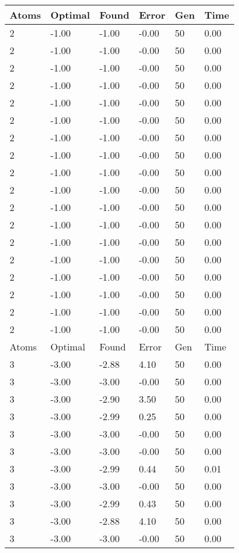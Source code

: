 \documentclass{report}
\begin{document}
\begin{appendix}
\begin{longtable}{llllll}
Atoms & Optimal & Found & Error & Gen & Time \\
\endfirsthead
%
\endhead
%
2 & -1.00 & -1.00 & -0.00 & 50 & 0.00 \\
2 & -1.00 & -1.00 & -0.00 & 50 & 0.00 \\
2 & -1.00 & -1.00 & -0.00 & 50 & 0.00 \\
2 & -1.00 & -1.00 & -0.00 & 50 & 0.00 \\
2 & -1.00 & -1.00 & -0.00 & 50 & 0.00 \\
2 & -1.00 & -1.00 & -0.00 & 50 & 0.00 \\
2 & -1.00 & -1.00 & -0.00 & 50 & 0.00 \\
2 & -1.00 & -1.00 & -0.00 & 50 & 0.00 \\
2 & -1.00 & -1.00 & -0.00 & 50 & 0.00 \\
2 & -1.00 & -1.00 & -0.00 & 50 & 0.00 \\
2 & -1.00 & -1.00 & -0.00 & 50 & 0.00 \\
2 & -1.00 & -1.00 & -0.00 & 50 & 0.00 \\
2 & -1.00 & -1.00 & -0.00 & 50 & 0.00 \\
2 & -1.00 & -1.00 & -0.00 & 50 & 0.00 \\
2 & -1.00 & -1.00 & -0.00 & 50 & 0.00 \\
2 & -1.00 & -1.00 & -0.00 & 50 & 0.00 \\
2 & -1.00 & -1.00 & -0.00 & 50 & 0.00 \\
2 & -1.00 & -1.00 & -0.00 & 50 & 0.00 \\
Atoms & Optimal & Found & Error & Gen & Time \\
3 & -3.00 & -2.88 & 4.10 & 50 & 0.00 \\
3 & -3.00 & -3.00 & -0.00 & 50 & 0.00 \\
3 & -3.00 & -2.90 & 3.50 & 50 & 0.00 \\
3 & -3.00 & -2.99 & 0.25 & 50 & 0.00 \\
3 & -3.00 & -3.00 & -0.00 & 50 & 0.00 \\
3 & -3.00 & -3.00 & -0.00 & 50 & 0.00 \\
3 & -3.00 & -2.99 & 0.44 & 50 & 0.01 \\
3 & -3.00 & -3.00 & -0.00 & 50 & 0.00 \\
3 & -3.00 & -2.99 & 0.43 & 50 & 0.00 \\
3 & -3.00 & -2.88 & 4.10 & 50 & 0.00 \\
3 & -3.00 & -3.00 & -0.00 & 50 & 0.00 \\

\end{longtable}
\end{appendix}
\end{document}
